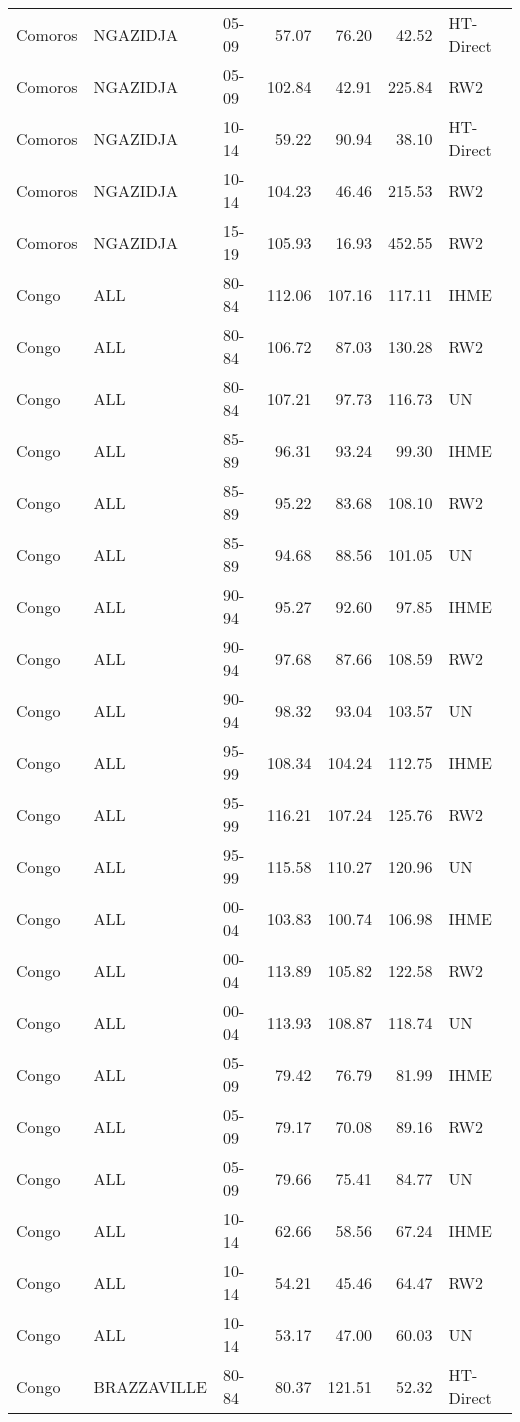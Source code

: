 \begin{longtable}{lllrrrl}
  Comoros & NGAZIDJA & 05-09 & 57.07 & 76.20 & 42.52 & HT-Direct \\ 
  Comoros & NGAZIDJA & 05-09 & 102.84 & 42.91 & 225.84 & RW2 \\ 
  Comoros & NGAZIDJA & 10-14 & 59.22 & 90.94 & 38.10 & HT-Direct \\ 
  Comoros & NGAZIDJA & 10-14 & 104.23 & 46.46 & 215.53 & RW2 \\ 
  Comoros & NGAZIDJA & 15-19 & 105.93 & 16.93 & 452.55 & RW2 \\ 
  Congo & ALL & 80-84 & 112.06 & 107.16 & 117.11 & IHME \\ 
  Congo & ALL & 80-84 & 106.72 & 87.03 & 130.28 & RW2 \\ 
  Congo & ALL & 80-84 & 107.21 & 97.73 & 116.73 & UN \\ 
  Congo & ALL & 85-89 & 96.31 & 93.24 & 99.30 & IHME \\ 
  Congo & ALL & 85-89 & 95.22 & 83.68 & 108.10 & RW2 \\ 
  Congo & ALL & 85-89 & 94.68 & 88.56 & 101.05 & UN \\ 
  Congo & ALL & 90-94 & 95.27 & 92.60 & 97.85 & IHME \\ 
  Congo & ALL & 90-94 & 97.68 & 87.66 & 108.59 & RW2 \\ 
  Congo & ALL & 90-94 & 98.32 & 93.04 & 103.57 & UN \\ 
  Congo & ALL & 95-99 & 108.34 & 104.24 & 112.75 & IHME \\ 
  Congo & ALL & 95-99 & 116.21 & 107.24 & 125.76 & RW2 \\ 
  Congo & ALL & 95-99 & 115.58 & 110.27 & 120.96 & UN \\ 
  Congo & ALL & 00-04 & 103.83 & 100.74 & 106.98 & IHME \\ 
  Congo & ALL & 00-04 & 113.89 & 105.82 & 122.58 & RW2 \\ 
  Congo & ALL & 00-04 & 113.93 & 108.87 & 118.74 & UN \\ 
  Congo & ALL & 05-09 & 79.42 & 76.79 & 81.99 & IHME \\ 
  Congo & ALL & 05-09 & 79.17 & 70.08 & 89.16 & RW2 \\ 
  Congo & ALL & 05-09 & 79.66 & 75.41 & 84.77 & UN \\ 
  Congo & ALL & 10-14 & 62.66 & 58.56 & 67.24 & IHME \\ 
  Congo & ALL & 10-14 & 54.21 & 45.46 & 64.47 & RW2 \\ 
  Congo & ALL & 10-14 & 53.17 & 47.00 & 60.03 & UN \\ 
  Congo & BRAZZAVILLE & 80-84 & 80.37 & 121.51 & 52.32 & HT-Direct \\ 

\end{longtable}
